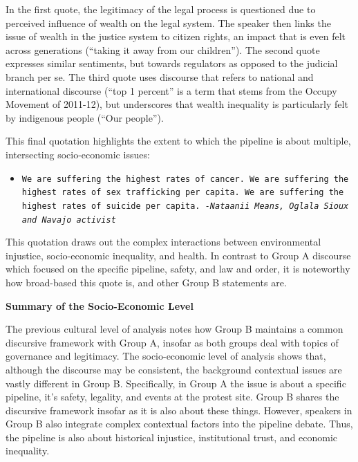 In the first quote, the legitimacy of the legal process is questioned due to perceived influence of wealth on the legal system. The speaker then links the issue of wealth in the justice system to citizen rights, an impact that is even felt across generations (``taking it away from our children''). The second quote expresses similar sentiments, but towards regulators as opposed to the judicial branch per se. The third quote uses discourse that refers to national and international discourse (``top 1 percent'' is a term that stems from the Occupy Movement of 2011-12), but underscores that wealth inequality is particularly felt by indigenous people (``Our people'').

This final quotation highlights the extent to which the pipeline is about multiple, intersecting socio-economic issues:

\begin{footnotesize}
\begin{itemize}
\item[] \texttt{We are suffering the highest rates of cancer. We are suffering the highest rates of sex trafficking per capita. We are suffering the highest rates of suicide per capita. \newline 
\textit{-Nataanii Means, Oglala Sioux and Navajo activist}}
\end{itemize}
\end{footnotesize}  

This quotation draws out the complex interactions between environmental injustice, socio-economic inequality, and health. In contrast to Group A discourse which focused on the specific pipeline, safety, and law and order, it is noteworthy how broad-based this quote is, and other Group B statements are. 

\textbf{Summary of the Socio-Economic Level}

The previous cultural level of analysis notes how Group B maintains a common discursive framework with Group A, insofar as both groups deal with topics of governance and legitimacy. The socio-economic level of analysis shows that, although the discourse may be consistent, the background contextual issues are vastly different in Group B. Specifically, in Group A the issue is about a specific pipeline, it's safety, legality, and events at the protest site. Group B shares the discursive framework insofar as it is also about these things. However, speakers in Group B also integrate complex contextual factors into the pipeline debate. Thus, the pipeline is also about historical injustice, institutional trust, and economic inequality.     

